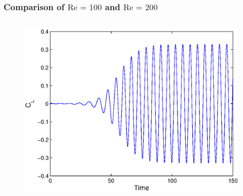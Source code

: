 		\begin{frame}[allowframebreaks]
			\frametitle{Comparison of $\text{Re = 100}$ and $\text{Re = 200}$}
			\begin{columns}[t]
				\column[]{6.5cm}
				\vspace{-1cm}
				\begin{figure}[htp]
					\centering		
					\includegraphics[width=\textwidth]{img/re100dg3cpd60cl.eps}
				\end{figure}


\end{columns}
\end{frame}
